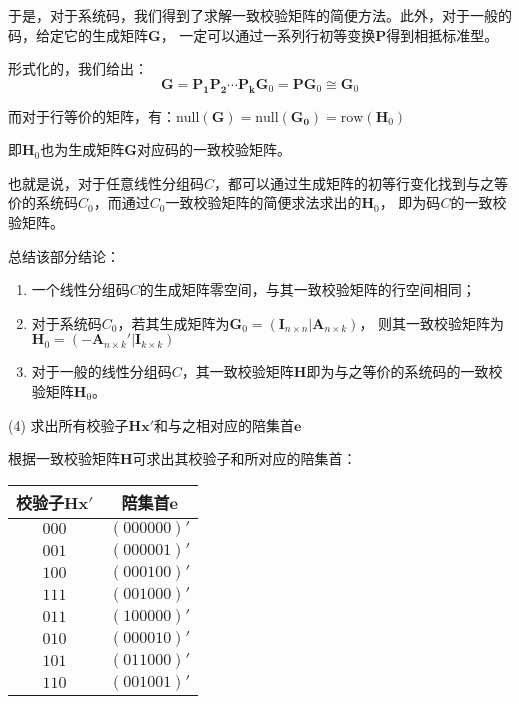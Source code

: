 \begin{Solution}
        于是，对于系统码，我们得到了求解一致校验矩阵的简便方法。此外，对于一般的码，给定它的生成矩阵$\bm{G}$，
        一定可以通过一系列行初等变换$\bm{P}$得到相抵标准型。

        形式化的，我们给出：
        \begin{equation}
            \bm{G} = \bm{P_1}\bm{P_2}\cdots\bm{P_k}\bm{G}_0 = \bm{P}\bm{G}_0 \cong \bm{G}_0
        \end{equation}

        而对于行等价的矩阵，有：$\mathrm{null}(\bm{G}) = \mathrm{null}(\bm{G_0}) = \mathrm{row}(\bm{H}_0)$

        即$\bm{H}_0$也为生成矩阵$\bm{G}$对应码的一致校验矩阵。
        
        也就是说，对于任意线性分组码$C$，都可以通过生成矩阵的初等行变化找到与之等价的系统码$C_0$，而通过$C_0$一致校验矩阵的简便求法求出的$\bm{H}_0$，
        即为码$C$的一致校验矩阵。

        总结该部分结论：
        \begin{enumerate}
            \item 一个线性分组码$C$的生成矩阵零空间，与其一致校验矩阵的行空间相同；
            \item 对于系统码$C_0$，若其生成矩阵为$\bm{G}_0=\left(\bm{I}_{n\times n} | \bm{A}_{n\times k}\right)$，
            则其一致校验矩阵为$\bm{H}_0 = \left( -\bm{A}_{n\times k}' |\bm{I}_{k\times k}\right)$
            \item 对于一般的线性分组码$C$，其一致校验矩阵$\bm{H}$即为与之等价的系统码的一致校验矩阵$\bm{H}_0$。
        \end{enumerate}
    \end{Solution}

    (4) 求出所有校验子$\bm{Hx}'$和与之相对应的陪集首$\bm{e}$

\begin{Solution}
根据一致校验矩阵$\bm{H}$可求出其校验子和所对应的陪集首：

    \begin{center}
        \begin{tabular}{cc}
            \toprule
            校验子$\bm{Hx}'$ & 陪集首$\bm{e}$ \\
            \midrule
            $000$ & $(000000)'$\\
            $001$ & $(000001)'$\\
            $100$ & $(000100)'$\\
            $111$ & $(001000)'$\\
            $011$ & $(100000)'$\\
            \hdashline
            $010$ & $(000010)'$\\
            $101$ & $(011000)'$                 \\
            $110$ & $(001001)'$                 \\
            \bottomrule
        \end{tabular}
    \end{center}
\end{Solution}


